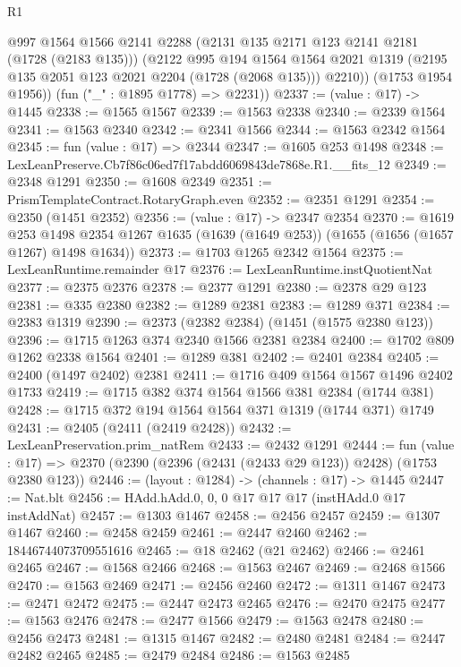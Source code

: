 \begin{lexlean}{R1}
\begin{coremodule}
          @997
          @1564
          @1566
          @2141
          @2288
          (@2131 @135 @2171 @123 @2141 @2181 (@1728 (@2183 @135)))
          (@2122
            @995
            @194
            @1564
            @1564
            @2021
            @1319
            (@2195 @135 @2051 @123 @2021 @2204 (@1728 (@2068 @135)))
            @2210))
        (@1753 @1954 @1956))
      (fun ("_" : @1895 @1778) => @2231))
@2337 := (value : @17) -> @1445
@2338 := @1565 @1567
@2339 := @1563 @2338
@2340 := @2339 @1564
@2341 := @1563 @2340
@2342 := @2341 @1566
@2344 := @1563 @2342 @1564
@2345 := fun (value : @17) => @2344
@2347 := @1605 @253 @1498
@2348 := LexLeanPreserve.Cb7f86c06ed7f17abdd6069843de7868e.R1.__fits_12
@2349 := @2348 @1291
@2350 := @1608 @2349
@2351 := PrismTemplateContract.RotaryGraph.even
@2352 := @2351 @1291
@2354 := @2350 (@1451 @2352)
@2356 := (value : @17) -> @2347 @2354
@2370 := @1619
    @253
    @1498
    @2354
    @1267
    @1635
    (@1639 (@1649 @253))
    (@1655 (@1656 (@1657 @1267) @1498 @1634))
@2373 := @1703 @1265 @2342 @1564
@2375 := LexLeanRuntime.remainder @17
@2376 := LexLeanRuntime.instQuotientNat
@2377 := @2375 @2376
@2378 := @2377 @1291
@2380 := @2378 @29 @123
@2381 := @335 @2380
@2382 := @1289 @2381
@2383 := @1289 @371
@2384 := @2383 @1319
@2390 := @2373 (@2382 @2384) (@1451 (@1575 @2380 @123))
@2396 := @1715 @1263 @374 @2340 @1566 @2381 @2384
@2400 := @1702 @809 @1262 @2338 @1564
@2401 := @1289 @381
@2402 := @2401 @2384
@2405 := @2400 (@1497 @2402) @2381
@2411 := @1716 @409 @1564 @1567 @1496 @2402 @1733
@2419 := @1715 @382 @374 @1564 @1566 @381 @2384 (@1744 @381)
@2428 := @1715 @372 @194 @1564 @1564 @371 @1319 (@1744 @371) @1749
@2431 := @2405 (@2411 (@2419 @2428))
@2432 := LexLeanPreservation.prim_natRem
@2433 := @2432 @1291
@2444 := fun (value : @17) =>
  @2370 (@2390 (@2396 (@2431 (@2433 @29 @123)) @2428) (@1753 @2380 @123))
@2446 := (layout : @1284) -> (channels : @17) -> @1445
@2447 := Nat.blt
@2456 := HAdd.hAdd.{0, 0, 0} @17 @17 @17 (instHAdd.{0} @17 instAddNat)
@2457 := @1303 @1467
@2458 := @2456 @2457
@2459 := @1307 @1467
@2460 := @2458 @2459
@2461 := @2447 @2460
@2462 := 18446744073709551616
@2465 := @18 @2462 (@21 @2462)
@2466 := @2461 @2465
@2467 := @1568 @2466
@2468 := @1563 @2467
@2469 := @2468 @1566
@2470 := @1563 @2469
@2471 := @2456 @2460
@2472 := @1311 @1467
@2473 := @2471 @2472
@2475 := @2447 @2473 @2465
@2476 := @2470 @2475
@2477 := @1563 @2476
@2478 := @2477 @1566
@2479 := @1563 @2478
@2480 := @2456 @2473
@2481 := @1315 @1467
@2482 := @2480 @2481
@2484 := @2447 @2482 @2465
@2485 := @2479 @2484
@2486 := @1563 @2485

\end{coremodule}
\end{lexlean}
